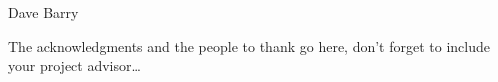 \documentclass[
11pt, %
oneside, %
ukrainian,
english, %
singlespacing, %
headsepline, %
]{BachelorMasterThesis} %
\begin{document}
\hfill Dave Barry


\begin{abstract}
\addchaptertocentry{\abstractname} %
The Thesis Abstract is written here (and usually kept to just this page). The page is kept centered vertically so can expand into the blank space above the title too\ldots 
\end{abstract}


\begin{acknowledgements}
\addchaptertocentry{\acknowledgementname} %
The acknowledgments and the people to thank go here, don't forget to include your project advisor\ldots
\end{acknowledgements}


\tableofcontents %

\listoffigures %

\listoftables %

\end{document}

